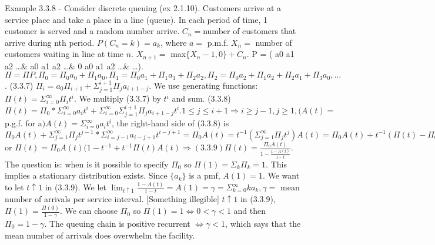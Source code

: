 \documentclass{article}
\begin{document}
Example 3.3.8 - Consider discrete queuing (ex 2.1.10). Customers arrive at a service place and take a place in a line (queue). In each period of time, 1 customer is served and a random number arrive. $C_n = $number of customers that arrive during nth period. $P(C_n = k) = a_k$, where $a =$ p.m.f. $X_n =$ number of customers waiting in line at time $n$. $X_{n+1} =$ max$\{X_n - 1, 0\} + C_n$. P = ( a0 a1 a2 \dots \& a0 a1 a2 \dots \& 0 a0 a1 a2 \dots \& \dots). $\Pi = \Pi P, \Pi_0 = \Pi_0 a_0 + \Pi_1 a_0, \Pi_1 = \Pi_0 a_1 + \Pi_1 a_1 + \Pi_2 a_2, \Pi_2 = \Pi_0 a_2 + \Pi_1 a_2 + \Pi_2 a_1 + \Pi_3 a_0, \dots$. (3.3.7) $\Pi_i = a_0 \Pi_{i+1} + \Sigma_{j = 1}^{i+1} \Pi_j a_{i+1-j}$. We use generating functions: $\Pi(t) = \Sigma_{i = 0}^\infty \Pi_i t^i$. We multiply (3.3.7) by $t^i$ and sum. (3.3.8) $\Pi(t) = \Pi_0 * \Sigma_{i=0}^\infty a_i t^i + \Sigma_{i=0}^\infty \Sigma_{j=1}^{i+1}\Pi_j a_{i+1-j} t^i. 1 \le j \le i + 1 \Rightarrow i \ge j - 1, j \ge 1, (A(t) =$ p.g.f. for a$) A(t) = \Sigma_{i=0}^\infty a_i t^i$, the right-hand side of (3.3.8) is $\Pi_0 A(t) + \Sigma_{j=1}^\infty \Pi_j t^{j-1} * \Sigma_{i=j-1}^\infty a_{i-j+1}t^{i-j+1} = \Pi_0 A(t) = t^{-1} (\Sigma_{j=1}^\infty \Pi_j t^j) A(t) = \Pi_0 A(t) + t^{-1} (\Pi(t) - \Pi_0) A(t)$ or $\Pi(t) = \Pi_0 A(t)(1-t^{-1} + t^{-1}\Pi(t)A(t) \Rightarrow (3.3.9) \Pi(t) = \frac{\Pi_0 A(t)}{1 - \frac{1 - A(t)}{1-t}}$. The question is: when is it possible to specify $\Pi_0$ so $\Pi(1) = \Sigma_k \Pi_k = 1$. This implies a stationary distribution exists. Since $\{a_k\}$ is a pmf, $A(1) = 1$. We want to let $t \uparrow 1$ in (3.3.9). We let $\lim_{t \uparrow 1} \frac{1 - A(t)}{1-t} = A(1) = \gamma = \Sigma_{k=0}^\infty k a_k, \gamma =$ mean number of arrivals per service interval. [Something illegible] $t \uparrow 1$ in (3.3.9), $\Pi(1) = \frac{\Pi(0)}{1-\gamma}$. We can choose $\Pi_0$ so $\Pi(1) = 1 \iff 0 < \gamma < 1$ and then $\Pi_0 = 1 - \gamma$. The queuing chain is positive recurrent $\iff \gamma < 1$, which says that the mean number of arrivals does overwhelm the facility.
\end{document}
